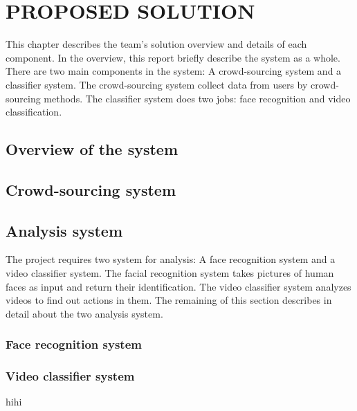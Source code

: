 \chapter{PROPOSED SOLUTION}
\label{chap:caseMedical}

This chapter describes the team's solution overview and details of each component. In the overview, this report briefly describe the system as a whole. There are two main components in the system: A crowd-sourcing system and a classifier system. The crowd-sourcing system collect data from users by crowd-sourcing methods. The classifier system does two jobs:  face recognition and video classification.
\section{Overview of the system}
\section{Crowd-sourcing system}
\section{Analysis system}
The project requires two system for analysis: A face recognition system and a video classifier system. The facial recognition system takes pictures of human faces as input and return their identification. The video classifier system analyzes videos to find out actions in them. The remaining of this section describes in detail about the two analysis system.
\subsection{Face recognition system}
\subsection{Video classifier system}
hihi
